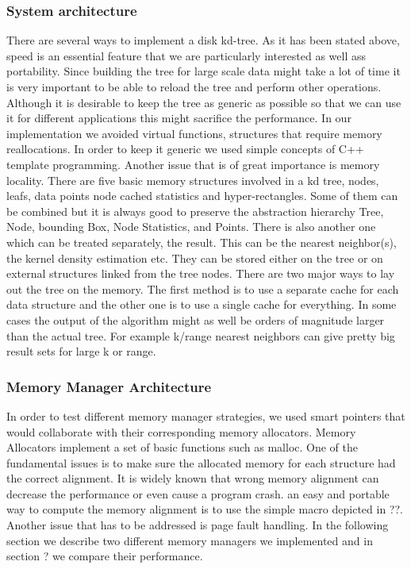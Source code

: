 \documentclass[12pt,letterpaper,doublespaced,ETD,dvips,proposal]{gtthesis}
\begin{document}
\begin{Body}
\subsubsection{System architecture} There are several ways to
implement a disk kd-tree. As it has been stated above, speed is an
essential feature that we are particularly interested as well ass
portability. Since building the tree for large scale data might take
a lot of time it is very important to be able to reload the tree and
perform other operations. Although it is desirable to keep the tree
as generic as possible so that we can use it for different
applications this might sacrifice the performance. In our
implementation we avoided virtual functions, structures that require
memory reallocations. In order to keep it generic we used simple
concepts of C++ template programming. Another issue that is of great
importance is memory locality. There are five basic memory
structures involved in a kd tree, nodes, leafs, data points node
cached statistics and hyper-rectangles. Some of them can be combined
but it is always good to preserve the abstraction hierarchy Tree,
Node, bounding Box, Node Statistics, and Points. There is also
another one which can be treated separately, the result. This can be
the nearest neighbor(s), the kernel density estimation etc. They can
be stored either on the tree or on external structures linked from
the tree nodes. There are two major ways to lay out the tree on the
memory. The first method is to use a separate cache for each data
structure and the other one is to use  a single cache for
everything. In some cases the output of the algorithm might as well
be orders of magnitude larger than the actual tree. For example
k/range nearest neighbors can give pretty big result sets for large
k or range.

\subsubsection{Memory Manager Architecture} In order to test
different memory manager strategies, we used smart pointers that
would collaborate with their corresponding memory allocators. Memory
Allocators implement a set of basic functions such as malloc. One of
the fundamental issues is to make sure the allocated memory for each
structure had the correct alignment. It is widely known that wrong
memory alignment can decrease the performance or even cause a
program crash. an easy and portable way to compute the memory
alignment is to use the simple macro depicted in ??. Another issue
that has to be addressed is page fault handling. In the following
section we describe two different memory managers we implemented and
in section ? we compare their performance.


\end{Body}
\end{document}
